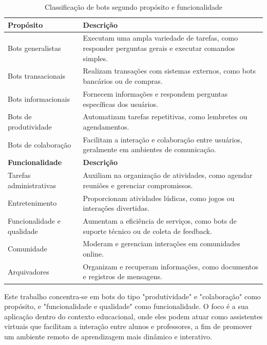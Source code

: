 \begin{table}[H]
\centering
\label{tab:classificacao_bots}
\begin{tabular}{|p{4.2cm}|p{9cm}|}
\hline
\textbf{Propósito}\cite{lebeuf2019}& \textbf{Descrição} \\
\hline
Bots generalistas & Executam uma ampla variedade de tarefas, como responder perguntas gerais e executar comandos simples. \\
\hline
Bots transacionais & Realizam transações com sistemas externos, como bots bancários ou de compras. \\
\hline
Bots informacionais & Fornecem informações e respondem perguntas específicas dos usuários. \\
\hline
Bots de produtividade & Automatizam tarefas repetitivas, como lembretes ou agendamentos. \\
\hline
Bots de colaboração & Facilitam a interação e colaboração entre usuários, geralmente em ambientes de comunicação. \\
\hline
\textbf{Funcionalidade}\cite{seering2018} & \textbf{Descrição} \\
\hline
Tarefas administrativas & Auxiliam na organização de atividades, como agendar reuniões e gerenciar compromissos. \\
\hline
Entretenimento & Proporcionam atividades lúdicas, como jogos ou interações divertidas. \\
\hline
Funcionalidade e qualidade & Aumentam a eficiência de serviços, como bots de suporte técnico ou de coleta de feedback. \\
\hline
Comunidade & Moderam e gerenciam interações em comunidades online. \\
\hline
Arquivadores & Organizam e recuperam informações, como documentos e registros de mensagens. \\
\hline
\end{tabular}
\caption{Classificação de bots segundo propósito e funcionalidade}
\end{table}

\noindent Este trabalho concentra-se em bots do tipo "produtividade" e "colaboração" como propósito, e "funcionalidade e qualidade" como funcionalidade. O foco é a sua aplicação dentro do contexto educacional, onde eles podem atuar como assistentes virtuais que facilitam a interação entre alunos e professores, a fim de promover um ambiente remoto de aprendizagem mais dinâmico e interativo.


